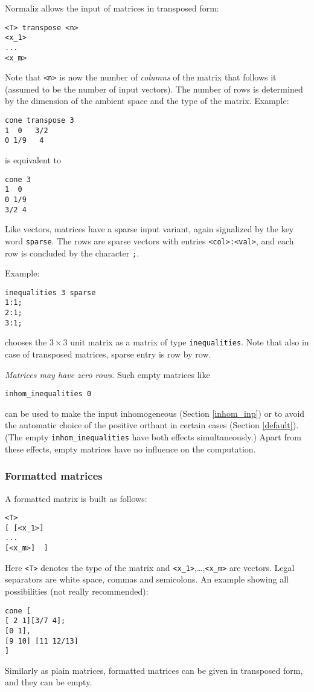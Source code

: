 \documentclass[12pt,a4paper]{scrartcl}
\theoremstyle{definition}
\def\ttt{\texttt}
\begin{document}
Normaliz allows the input of matrices in transposed form:
\begin{Verbatim}
<T> transpose <n>
<x_1>
...
<x_m>
\end{Verbatim}
Note that \verb|<n>| is now the number of \emph{columns} of the matrix that follows it (assumed to be the number of input vectors). The number of rows is determined by the dimension of the ambient space and the type of the matrix.  Example:
\begin{Verbatim}
cone transpose 3
1  0   3/2
0 1/9   4
\end{Verbatim}
is equivalent to
\begin{Verbatim}
cone 3
1  0
0 1/9
3/2 4
\end{Verbatim}

Like vectors, matrices have a sparse input variant, again signalized by the key word \verb|sparse|. The rows are sparse vectors with entries \verb|<col>:<val>|, and each row is concluded by the character \verb|;|.

Example:
\begin{Verbatim}
inequalities 3 sparse
1:1;
2:1;
3:1;
\end{Verbatim}
chooses the $3\times 3$ unit matrix as a matrix of type \verb|inequalities|. Note that also in case of transposed matrices, sparse entry is row by row.

\emph{Matrices may have zero rows.} Such empty matrices like
\begin{Verbatim}
inhom_inequalities 0
\end{Verbatim}

can be used to make the input inhomogeneous (Section \ref{inhom_inp}) or to avoid the automatic choice of the positive orthant in certain cases (Section \ref{default}). (The empty \verb|inhom_inequalities| have both effects simultaneously.) Apart from these effects, empty matrices have no influence on the computation.

\subsubsection{Formatted matrices}

A formatted matrix is built as follows:
\begin{Verbatim}
<T>
[ [<x_1>]
...
[<x_m>]  ]
\end{Verbatim}
Here \ttt{<T>} denotes the type of the matrix and \verb|<x_1>|,\dots,\verb|<x_m>| are vectors. Legal separators are white space, commas and semicolons. An example showing all possibilities (not really recommended):
\begin{Verbatim}
cone [
[ 2 1][3/7 4];
[0 1],
[9 10] [11 12/13]
]
\end{Verbatim} 
Similarly as plain matrices, formatted matrices can be given in transposed form, and they can be empty.
\end{document}
